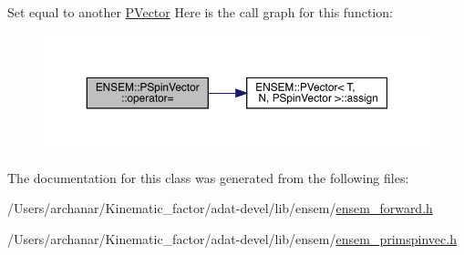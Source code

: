 Set equal to another \mbox{\hyperlink{classENSEM_1_1PVector}{P\+Vector}} Here is the call graph for this function\+:
\nopagebreak
\begin{figure}[H]
\begin{center}
\leavevmode
\includegraphics[width=350pt]{d0/dce/classENSEM_1_1PSpinVector_a6c7a984a7ab5ad8939e0a9bc57a93660_cgraph}
\end{center}
\end{figure}


The documentation for this class was generated from the following files\+:\begin{DoxyCompactItemize}
\item 
/\+Users/archanar/\+Kinematic\+\_\+factor/adat-\/devel/lib/ensem/\mbox{\hyperlink{adat-devel_2lib_2ensem_2ensem__forward_8h}{ensem\+\_\+forward.\+h}}\item 
/\+Users/archanar/\+Kinematic\+\_\+factor/adat-\/devel/lib/ensem/\mbox{\hyperlink{adat-devel_2lib_2ensem_2ensem__primspinvec_8h}{ensem\+\_\+primspinvec.\+h}}\end{DoxyCompactItemize}
